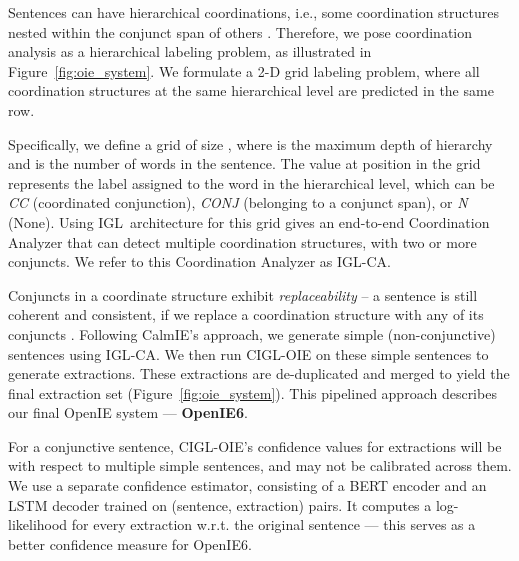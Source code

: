 \documentclass[11pt,a4paper]{article}
\newcommand{\shortname}{{\scshape IGL}}
\begin{document}
Sentences can have hierarchical coordinations, i.e., some coordination structures nested within the conjunct span of others \cite{saha&mausam18}.
Therefore, we pose coordination analysis as a hierarchical labeling problem, as illustrated in Figure~\ref{fig:oie_system}. We formulate a 2-D grid labeling problem, where all coordination structures at the same hierarchical level are predicted in the same row.

Specifically, we define a grid of size , where  is the maximum depth of hierarchy and  is the number of words in the sentence. The value at  position in the grid represents the label assigned to the  word in the  hierarchical level, which can be \textit{CC} (coordinated conjunction), \textit{CONJ} (belonging to a conjunct span), or \textit{N} (None). 
Using \shortname\ architecture for this grid gives an end-to-end Coordination Analyzer that can detect multiple coordination structures, with two or more conjuncts. We refer to this Coordination Analyzer as \shortname-CA.  

\vspace{0.5ex}
Conjuncts in a coordinate structure exhibit \emph{replaceability} -- a sentence is still coherent and consistent, if we replace a coordination structure with any of its conjuncts \cite{ficler&goldberg16b}. Following CalmIE's approach, we generate simple (non-conjunctive) sentences using \shortname-CA. We then run C\shortname-OIE on these simple sentences to generate extractions. These extractions are de-duplicated and merged to yield the final extraction set (Figure~\ref{fig:oie_system}).
This pipelined approach describes our final OpenIE system --- \textbf{OpenIE6}.





For a conjunctive sentence, C\shortname-OIE's confidence values for extractions will be with respect to multiple simple sentences, and may not be calibrated across them. We use a separate confidence estimator, consisting of a BERT encoder and an LSTM decoder trained on (sentence, extraction) pairs. It computes a log-likelihood for every extraction w.r.t. the original sentence --- this serves as a better confidence measure for OpenIE6.
\end{document}
